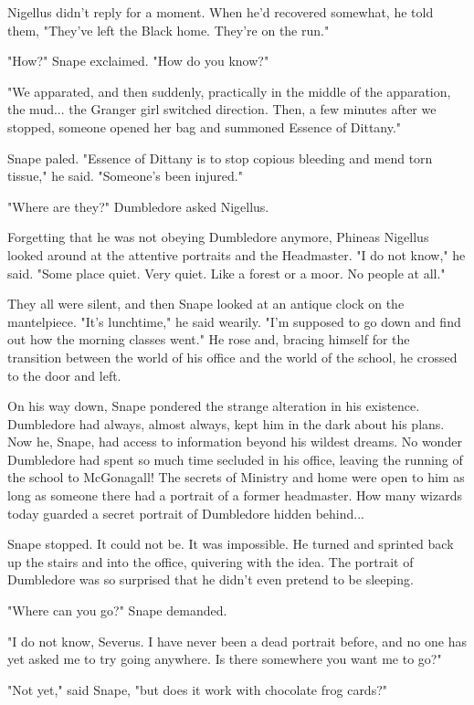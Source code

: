 \documentclass[a4paper,11pt]{article}
\begin{document}
Nigellus didn't reply for a moment. When he'd recovered somewhat, he told them, "They've left the Black home. They're on the run."

"How?" Snape exclaimed. "How do you know?"

"We apparated, and then suddenly, practically in the middle of the apparation, the mud... the Granger girl switched direction. Then, a few minutes after we stopped, someone opened her bag and summoned Essence of Dittany."

Snape paled. "Essence of Dittany is to stop copious bleeding and mend torn tissue," he said. "Someone's been injured."

"Where are they?" Dumbledore asked Nigellus.

Forgetting that he was not obeying Dumbledore anymore, Phineas Nigellus looked around at the attentive portraits and the Headmaster. "I do not know," he said. "Some place quiet. Very quiet. Like a forest or a moor. No people at all."

They all were silent, and then Snape looked at an antique clock on the mantelpiece. "It's lunchtime," he said wearily. "I'm supposed to go down and find out how the morning classes went." He rose and, bracing himself for the transition between the world of his office and the world of the school, he crossed to the door and left.

On his way down, Snape pondered the strange alteration in his existence. Dumbledore had always, almost always, kept him in the dark about his plans. Now he, Snape, had access to information beyond his wildest dreams. No wonder Dumbledore had spent so much time secluded in his office, leaving the running of the school to McGonagall! The secrets of Ministry and home were open to him as long as someone there had a portrait of a former headmaster. How many wizards today guarded a secret portrait of Dumbledore hidden behind...

Snape stopped. It could not be. It was impossible. He turned and sprinted back up the stairs and into the office, quivering with the idea. The portrait of Dumbledore was so surprised that he didn't even pretend to be sleeping.

"Where can you go?" Snape demanded.

"I do not know, Severus. I have never been a dead portrait before, and no one has yet asked me to try going anywhere. Is there somewhere you want me to go?"

"Not yet," said Snape, "but does it work with chocolate frog cards?"
\end{document}
